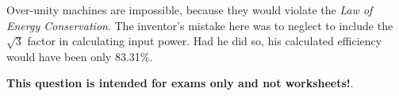 





Over-unity machines are impossible, because they would violate the {\it Law of Energy Conservation}.  The inventor's mistake here was to neglect to include the $\sqrt{3}$ factor in calculating input power.  Had he did so, his calculated efficiency would have been only 83.31\%.







{\bf This question is intended for exams only and not worksheets!}.


